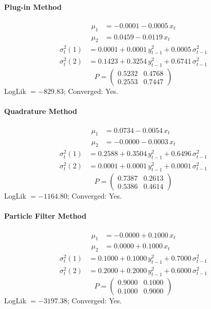 \documentclass[11pt, a4paper]{article}
\begin{document}
\paragraph{Plug-in Method}
\begin{align}
\mu_{1} &= -0.0001 -0.0005\, x_t \\
\mu_{2} &= 0.0459 -0.0119\, x_t
\end{align}
\begin{align}
\sigma^2_{t}(1) &= 0.0001 + 0.0001\, y_{t-1}^2 + 0.0005\, \sigma^2_{t-1} \\
\sigma^2_{t}(2) &= 0.1423 + 0.3254\, y_{t-1}^2 + 0.6741\, \sigma^2_{t-1}
\end{align}
\begin{equation}
P = \begin{pmatrix} 0.5232 & 0.4768 \\ 0.2553 & 0.7447 \end{pmatrix}
\end{equation}
LogLik $= -829.83$; Converged: Yes.

\paragraph{Quadrature Method}
\begin{align}
\mu_{1} &= 0.0734 -0.0054\, x_t \\
\mu_{2} &= -0.0000 -0.0003\, x_t
\end{align}
\begin{align}
\sigma^2_{t}(1) &= 0.2588 + 0.3504\, y_{t-1}^2 + 0.6496\, \sigma^2_{t-1} \\
\sigma^2_{t}(2) &= 0.0001 + 0.0001\, y_{t-1}^2 + 0.0001\, \sigma^2_{t-1}
\end{align}
\begin{equation}
P = \begin{pmatrix} 0.7387 & 0.2613 \\ 0.5386 & 0.4614 \end{pmatrix}
\end{equation}
LogLik $= -1164.80$; Converged: Yes.

\paragraph{Particle Filter Method}
\begin{align}
\mu_{1} &= -0.0000 + 0.1000\, x_t \\
\mu_{2} &= 0.0000 + 0.1000\, x_t
\end{align}
\begin{align}
\sigma^2_{t}(1) &= 0.1000 + 0.1000\, y_{t-1}^2 + 0.7000\, \sigma^2_{t-1} \\
\sigma^2_{t}(2) &= 0.2000 + 0.2000\, y_{t-1}^2 + 0.6000\, \sigma^2_{t-1}
\end{align}
\begin{equation}
P = \begin{pmatrix} 0.9000 & 0.1000 \\ 0.1000 & 0.9000 \end{pmatrix}
\end{equation}
LogLik $= -3197.38$; Converged: Yes.
\end{document}
